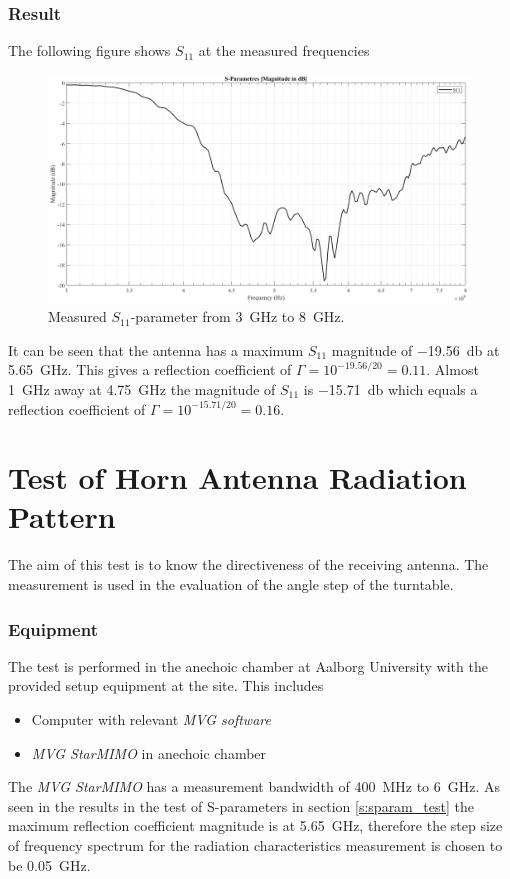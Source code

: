 \subsubsection{Result}
The following figure shows $S_{11}$ at the measured frequencies
\begin{figure}[H]
    \centering
    \includegraphics[width=1\textwidth]{figures/s11_meas.png}
    \caption{Measured $S_{11}$-parameter from \SI{3}{\giga\hertz} to \SI{8}{\giga\hertz}.} \label{fig:s11_meas}
\end{figure}
It can be seen that the antenna has a maximum $S_{11}$ magnitude of \SI{-19.56}{\decibel} at \SI{5.65}{\giga\hertz}. This gives a reflection coefficient of $\Gamma = 10^{-19.56/20} = 0.11$. Almost \SI{1}{\giga\hertz} away at \SI{4.75}{\giga\hertz} the magnitude of $S_{11}$ is \SI{-15.71}{\decibel} which equals a reflection coefficient of $\Gamma = 10^{-15.71/20} = 0.16$.

\section{Test of Horn Antenna Radiation Pattern} \label{s:rad_test}
The aim of this test is to know the directiveness of the receiving antenna. The measurement is used in the evaluation of the angle step of the turntable.

\subsubsection{Equipment}
The test is performed in the anechoic chamber at Aalborg University with the provided setup equipment at the site. This includes
\begin{itemize}
    \item Computer with relevant \textit{MVG software}
    \item \textit{MVG StarMIMO} in anechoic chamber
\end{itemize}
The \textit{MVG StarMIMO} has a measurement bandwidth of \SI{400}{\mega\hertz} to \SI{6}{\giga\hertz}. As seen in the results in the test of S-parameters in section \ref{s:sparam_test} the maximum reflection coefficient magnitude is at \SI{5.65}{\giga\hertz}, therefore the step size of frequency spectrum for the radiation characteristics measurement is chosen to be \SI{0.05}{\giga\hertz}.

